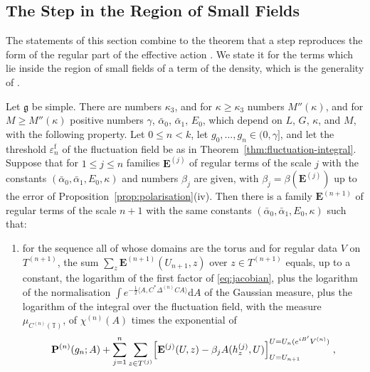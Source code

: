 \documentclass[11pt]{preprint}
\newcommand{\dd}{\mathrm{d}}
\numberwithin{equation}{section}
\begin{document}
\subsection{The Step in the Region of Small Fields}\label{sec:small-field-step}

The statements of this section combine to the theorem that a step reproduces the form of the regular part of the effective action \cite[Theorem~3, p.~264]{BalabanRG1}. We state it for the terms which lie inside the region of small fields of a term of the density, which is the generality of \cite[pp.~272--279]{BalabanCRE}.

\begin{theorem}\label{thm:small-field-step}
Let $\mathfrak g$ be simple. There are numbers $\kappa_3$, and for $\kappa \geqslant \kappa_3$ numbers $M''(\kappa)$, and for $M \geqslant M''(\kappa)$ positive numbers $\gamma$, $\bar\alpha_0$, $\bar\alpha_1$, $E_0$, which depend on $L$, $G$, $\kappa$, and $M$, with the following property. Let $0 \leqslant n < k$, let $g_0, \dots, g_n \in (0, \gamma]$, and let the threshold $\varepsilon^{\mathrm f}_n$ of the fluctuation field be as in Theorem~\ref{thm:fluctuation-integral}. Suppose that for $1 \leqslant j \leqslant n$ families $\mathbf E^{(j)}$ of regular terms of the scale $j$ with the constants $(\bar\alpha_0, \bar\alpha_1, E_0, \kappa)$ and numbers $\beta_j$ are given, with $\beta_j = \beta(\mathbf E^{(j)})$ up to the error of Proposition~\ref{prop:polarisation}(iv). Then there is a family $\mathbf E^{(n+1)}$ of regular terms of the scale $n + 1$ with the same constants $(\bar\alpha_0, \bar\alpha_1, E_0, \kappa)$ such that:
\begin{enumerate}[label=(\roman*)]
\item for the sequence all of whose domains are the torus and for regular data $V$ on $T^{(n+1)}$, the sum $\sum_z\mathbf E^{(n+1)}(U_{n+1}, z)$ over $z \in T^{(n+1)}$ equals, up to a constant, the logarithm of the first factor of \eqref{eq:jacobian}, plus the logarithm of the normalisation $\int e^{-\frac{1}{2}\langle A, C^*\Delta^{(n)}CA\rangle}\dd A$ of the Gaussian measure, plus the logarithm of the integral over the fluctuation field, with the measure $\mu_{C^{(n)}(\mathbb T)}$, of $\chi^{(n)}(A)$ times the exponential of
\begin{equation}\label{eq:small-field-integrand}
    \mathbf P^{(n)}(g_n; A) + \sum_{j=1}^{n}\sum_{z \in T^{(j)}}\Bigl[\mathbf E^{(j)}(U, z) - \beta_jA(h^{(j)}_z, U)\Bigr]_{U = U_{n+1}}^{U = U_n(e^{iB'}V^{(n)})}\;,

\end{equation}
\end{enumerate}
\end{theorem}
\end{document}
